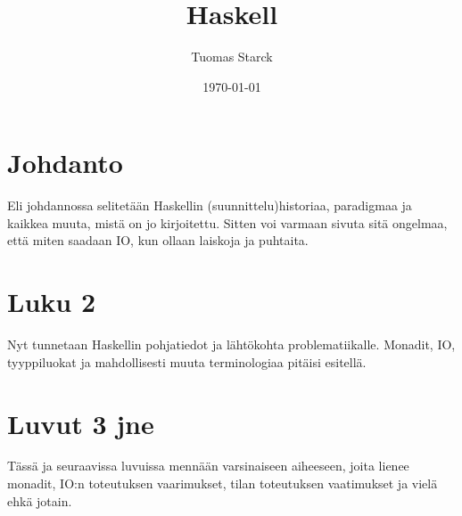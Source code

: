 \documentclass[finnish]{tktltiki2}
\title{Haskell}
\author{Tuomas Starck}
\date{\today}
\begin{document}
\frontmatter

\maketitle
\makeabstract

\tableofcontents

\mainmatter


\section{Johdanto}


Eli johdannossa selitetään Haskellin (suunnittelu)historiaa, paradigmaa ja kaikkea muuta, mistä on
jo kirjoitettu. Sitten voi varmaan sivuta sitä ongelmaa, että miten saadaan IO, kun ollaan laiskoja
ja puhtaita.


\section{Luku 2}


Nyt tunnetaan Haskellin pohjatiedot ja lähtökohta problematiikalle. Monadit, IO, tyyppiluokat ja
mahdollisesti muuta terminologiaa pitäisi esitellä.


\section{Luvut 3 jne}


Tässä ja seuraavissa luvuissa mennään varsinaiseen aiheeseen, joita lienee monadit, IO:n toteutuksen
vaarimukset, tilan toteutuksen vaatimukset ja vielä ehkä jotain.
\end{document}

